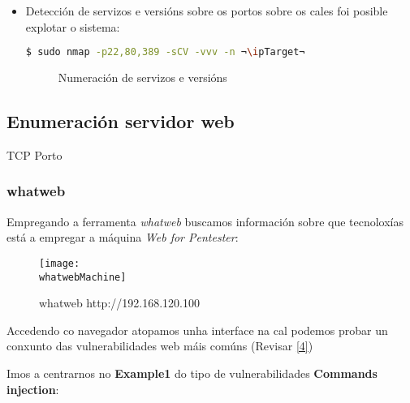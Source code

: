 \documentclass[a4paper]{article}
\newcommand{\nmapTargeted}{nmap_pentesterlab_targeted.png}
\newcommand{\whatwebMachine}{whatweb_pentesterlab.png}
\newcommand{\ipTarget}{192.168.120.100}
\begin{document}
\begin{itemize}
        \clearpage
        \item Detección de servizos e versións sobre os portos sobre os cales foi posible explotar o sistema:

        \begin{lstlisting}[language=Bash, caption=nmap scripting sobre servizos e versións]
$ sudo nmap -p22,80,389 -sCV -vvv -n ¬\ipTarget¬\end{lstlisting}
         \begin{figure}[h]
                \begin{center}
                \caption{Numeración de servizos e versións}
                \label{fig:servicesResults}
                \end{center}
        \end{figure}

        \end{itemize}
        \subsection{Enumeración servidor web}
        \vspace{0.2cm}

        \begin{schema}{TCP}
        Porto
        \end{schema}

        \subsubsection{whatweb}
        \vspace{0.2cm}
        Empregando a ferramenta \textit{whatweb} buscamos información sobre que tecnoloxías está a empregar a máquina \textit{Web for Pentester}: 
         \begin{figure}[h]
                \centering
                \texttt{[image: \\whatwebMachine]}
                \caption{whatweb http://\ipTarget}
        \end{figure}

        \clearpage
        Accedendo co navegador atopamos unha interface na cal podemos probar un conxunto das vulnerabilidades web máis comúns (Revisar  
        \href{https://raw.githubusercontent.com/ricardofc/repoEDU-CCbySA/main/SI/Pentester/Practica-SI-PentesterLab_pageNumbers.pdf}{\color{blue}[4]})\par
        Imos a centrarnos no \textbf{Example1} do tipo de vulnerabilidades \large{\textbf{Commands injection}}:
\end{document}
